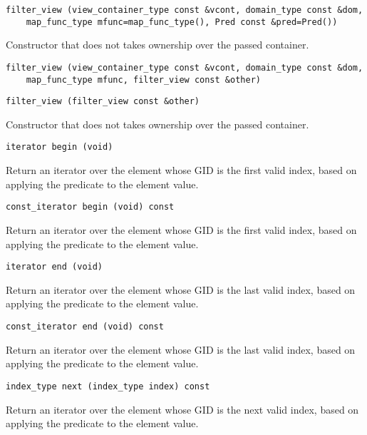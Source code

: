 \begin{verbatim}
filter_view (view_container_type const &vcont, domain_type const &dom,
    map_func_type mfunc=map_func_type(), Pred const &pred=Pred())
\end{verbatim}

Constructor that does not takes ownership over the passed container.

\begin{verbatim}
filter_view (view_container_type const &vcont, domain_type const &dom,
    map_func_type mfunc, filter_view const &other)
\end{verbatim}

\begin{verbatim}
filter_view (filter_view const &other)
\end{verbatim}

Constructor that does not takes ownership over the passed container.

\begin{verbatim}
iterator begin (void)
\end{verbatim}

Return an iterator over the element whose GID is the first valid index,
based on applying the predicate to the element value.

\begin{verbatim}
const_iterator begin (void) const
\end{verbatim}

Return an iterator over the element whose GID is the first valid index,
based on applying the predicate to the element value.

\begin{verbatim}
iterator end (void)
\end{verbatim}

Return an iterator over the element whose GID is the last valid index,
based on applying the predicate to the element value.

\begin{verbatim}
const_iterator end (void) const
\end{verbatim}

Return an iterator over the element whose GID is the last valid index,
based on applying the predicate to the element value.

\begin{verbatim}
index_type next (index_type index) const
\end{verbatim}

Return an iterator over the element whose GID is the next valid index,
based on applying the predicate to the element value.

